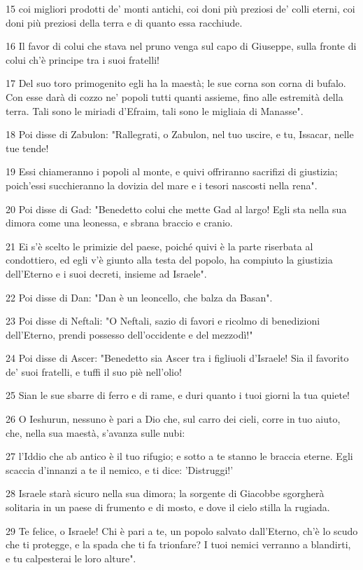 \par 15 coi migliori prodotti de' monti antichi, coi doni più preziosi de' colli eterni, coi doni più preziosi della terra e di quanto essa racchiude.
\par 16 Il favor di colui che stava nel pruno venga sul capo di Giuseppe, sulla fronte di colui ch'è principe tra i suoi fratelli!
\par 17 Del suo toro primogenito egli ha la maestà; le sue corna son corna di bufalo. Con esse darà di cozzo ne' popoli tutti quanti assieme, fino alle estremità della terra. Tali sono le miriadi d'Efraim, tali sono le migliaia di Manasse".
\par 18 Poi disse di Zabulon: "Rallegrati, o Zabulon, nel tuo uscire, e tu, Issacar, nelle tue tende!
\par 19 Essi chiameranno i popoli al monte, e quivi offriranno sacrifizi di giustizia; poich'essi succhieranno la dovizia del mare e i tesori nascosti nella rena".
\par 20 Poi disse di Gad: "Benedetto colui che mette Gad al largo! Egli sta nella sua dimora come una leonessa, e sbrana braccio e cranio.
\par 21 Ei s'è scelto le primizie del paese, poiché quivi è la parte riserbata al condottiero, ed egli v'è giunto alla testa del popolo, ha compiuto la giustizia dell'Eterno e i suoi decreti, insieme ad Israele".
\par 22 Poi disse di Dan: "Dan è un leoncello, che balza da Basan".
\par 23 Poi disse di Neftali: "O Neftali, sazio di favori e ricolmo di benedizioni dell'Eterno, prendi possesso dell'occidente e del mezzodì!"
\par 24 Poi disse di Ascer: "Benedetto sia Ascer tra i figliuoli d'Israele! Sia il favorito de' suoi fratelli, e tuffi il suo piè nell'olio!
\par 25 Sian le sue sbarre di ferro e di rame, e duri quanto i tuoi giorni la tua quiete!
\par 26 O Ieshurun, nessuno è pari a Dio che, sul carro dei cieli, corre in tuo aiuto, che, nella sua maestà, s'avanza sulle nubi:
\par 27 l'Iddio che ab antico è il tuo rifugio; e sotto a te stanno le braccia eterne. Egli scaccia d'innanzi a te il nemico, e ti dice: 'Distruggi!'
\par 28 Israele starà sicuro nella sua dimora; la sorgente di Giacobbe sgorgherà solitaria in un paese di frumento e di mosto, e dove il cielo stilla la rugiada.
\par 29 Te felice, o Israele! Chi è pari a te, un popolo salvato dall'Eterno, ch'è lo scudo che ti protegge, e la spada che ti fa trionfare? I tuoi nemici verranno a blandirti, e tu calpesterai le loro alture".

